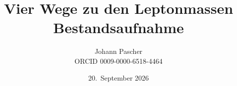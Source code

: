 \documentclass[11pt,a4paper]{report}
\title{Vier Wege zu den Leptonmassen\\[0.5em]\large Bestandsaufnahme}
\date{20.~September 2026}
\author{Johann Pascher\\\small ORCID 0009-0000-6518-4464}
\begin{document}
\renewcommand{\thechapter}{}
\renewcommand{\thesection}{\arabic{section}}
\maketitle
\tableofcontents

\end{document}
